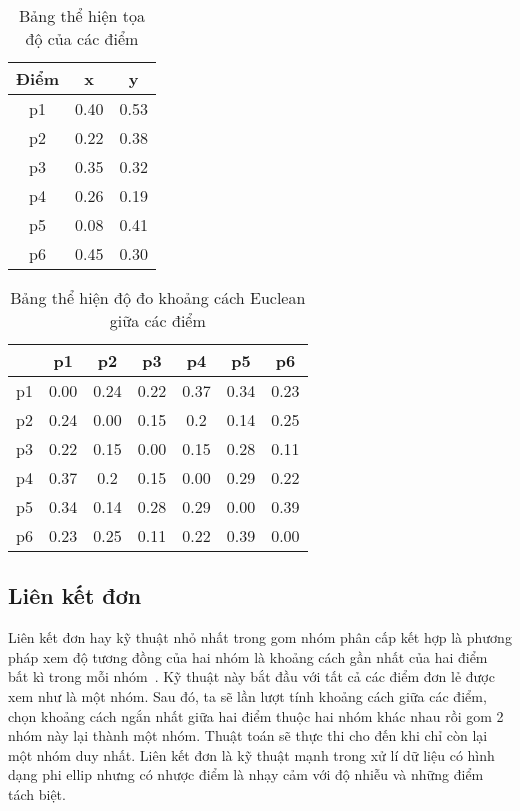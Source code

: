\begin{table}[h!]
\centering
\caption{Bảng thể hiện tọa độ của các điểm}
\label{tab:2_1}
\begin{tabular}{|c|c|c|}
\hline
Điểm & x & y \\ \hline
p1    & 0.40         & 0.53         \\ \hline
p2    & 0.22         & 0.38         \\ \hline
p3    & 0.35         & 0.32         \\ \hline
p4    & 0.26         & 0.19         \\ \hline
p5    & 0.08         & 0.41         \\ \hline
p6    & 0.45         & 0.30         \\ \hline
\end{tabular}
\end{table}

\begin{table}[h!]
\centering
\caption{Bảng thể hiện độ đo khoảng cách Euclean giữa các điểm}
\label{tab:2_2}
\begin{tabular}{|c|c|c|c|c|c|c|}
\hline
   & p1   & p2   & p3   & p4   & p5   & p6   \\ \hline
p1 & 0.00 & 0.24 & 0.22 & 0.37 & 0.34 & 0.23 \\ \hline
p2 & 0.24 & 0.00 & 0.15 & 0.2  & 0.14 & 0.25 \\ \hline
p3 & 0.22 & 0.15 & 0.00 & 0.15 & 0.28 & 0.11 \\ \hline
p4 & 0.37 & 0.2  & 0.15 & 0.00 & 0.29 & 0.22 \\ \hline
p5 & 0.34 & 0.14 & 0.28 & 0.29 & 0.00 & 0.39 \\ \hline
p6 & 0.23 & 0.25 & 0.11 & 0.22 & 0.39 & 0.00 \\ \hline
\end{tabular}%
\end{table}

\subsection{Liên kết đơn}	
\label{sec:lkd}	
Liên kết đơn hay kỹ thuật nhỏ nhất trong gom nhóm phân cấp kết hợp là phương pháp xem độ tương đồng của hai nhóm là khoảng cách gần nhất của hai điểm bất kì trong mỗi nhóm~\cite{Vipin-Kumar, HAC, AHC, hierarchical-clustering, single-complete, explain-HAC}. 
Kỹ thuật này bắt đầu với tất cả các điểm đơn lẻ được xem như là một nhóm.
Sau đó, ta sẽ lần lượt tính khoảng cách giữa các điểm, chọn khoảng cách ngắn nhất giữa hai điểm thuộc hai nhóm khác nhau rồi gom 2 nhóm này lại thành một nhóm.
Thuật toán sẽ thực thi cho đến khi chỉ còn lại một nhóm duy nhất.
Liên kết đơn là kỹ thuật mạnh trong xử lí dữ liệu có hình dạng phi ellip nhưng có nhược điểm là nhạy cảm với độ nhiễu và những điểm tách biệt.

